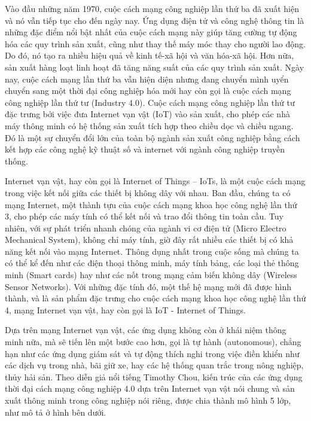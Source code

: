 Vào đầu những năm 1970, cuộc cách mạng công nghiệp lần thứ ba đã xuất hiện và nó vẫn tiếp tục cho đến ngày nay. Ứng dụng điện tử và công nghệ thông tin là những đặc điểm nổi bật nhất của cuộc cách mạng này giúp tăng cường tự động hóa các quy trình sản xuất, cũng như thay thế máy móc thay cho người lao động. Do đó, nó tạo ra nhiều hiệu quả về kinh tế-xã hội và văn hóa-xã hội. Hơn nữa, sản xuất hàng loạt linh hoạt đã tăng năng suất của các quy trình sản xuất. Ngày nay, cuộc cách mạng lần thứ ba vẫn hiện diện nhưng đang chuyển mình uyển chuyển sang một thời đại công nghiệp hóa mới hay còn gọi là cuộc cách mạng công nghiệp lần thứ tư (Industry 4.0). Cuộc cách mạng công nghiệp lần thứ tư đặc trưng bởi việc đưa Internet vạn vật (IoT) vào sản xuất, cho phép các nhà máy thông minh có hệ thống sản xuất tích hợp theo chiều dọc và chiều ngang. Đó là một sự chuyển đổi lớn của toàn bộ ngành sản xuất công nghiệp bằng cách kết hợp các công nghệ kỹ thuật số và internet với ngành công nghiệp truyền thống.

Internet vạn vật, hay còn gọi là Internet of Things – IoTs, là một cuộc cách mạng trong việc kết nối giữa các thiết bị không dây với nhau. Ban đầu, chúng ta có mạng Internet, một thành tựu của cuộc cách mạng khoa học công nghệ lần thứ 3, cho phép các máy tính có thể kết nối và trao đổi thông tin toàn cầu. Tuy nhiên, với sự phát triển nhanh chóng của ngành vi cơ điện tử (Micro Electro Mechanical System), không chỉ máy tính, giờ đây rất nhiều các thiết bị có khả năng kết nối vào mạng Internet. Thông dụng nhất trong cuộc sống mà chúng ta có thể kể đến như các điện thoại thông minh, máy tính bảng, các loại thẻ thông minh (Smart cards) hay như các nốt trong mạng cảm biến không dây (Wireless Sensor Networks). Với những đặc tính đó, một thế hệ mạng mới đã được hình thành, và là sản phẩm đặc trưng cho cuộc cách mạng khoa học công nghệ lần thứ 4, mạng Internet vạn vật, hay còn gọi là IoT - Internet of Things.

Dựa trên mạng Internet vạn vật, các ứng dụng không còn ở khái niệm thông minh nữa, mà sẽ tiến lên một bước cao hơn, gọi là tự hành (autonomous), chẳng hạn như các ứng dụng giám sát và tự động thích nghi trong việc điền khiển như các dịch vụ trong nhà, bãi giữ xe, hay các hệ thống quan trắc trong nông nghiệp, thủy hải sản. Theo diễn giả nổi tiếng Timothy Chou, kiến trúc của các ứng dụng thời đại cách mạng công nghiệp 4.0 dựa trên Internet vạn vật nói chung và sản xuất thông minh trong công nghiệp nói riêng, được chia thành mô hình 5 lớp, như mô tả ở hình bên dưới.

